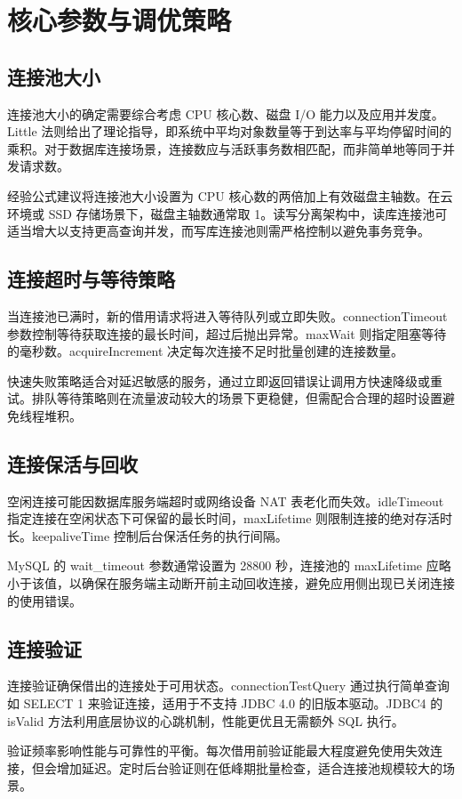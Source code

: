 \chapter{核心参数与调优策略}
\section{连接池大小}
连接池大小的确定需要综合考虑 CPU 核心数、磁盘 I/O 能力以及应用并发度。Little 法则给出了理论指导，即系统中平均对象数量等于到达率与平均停留时间的乘积。对于数据库连接场景，连接数应与活跃事务数相匹配，而非简单地等同于并发请求数。\par
经验公式建议将连接池大小设置为 CPU 核心数的两倍加上有效磁盘主轴数。在云环境或 SSD 存储场景下，磁盘主轴数通常取 1。读写分离架构中，读库连接池可适当增大以支持更高查询并发，而写库连接池则需严格控制以避免事务竞争。\par
\section{连接超时与等待策略}
当连接池已满时，新的借用请求将进入等待队列或立即失败。connectionTimeout 参数控制等待获取连接的最长时间，超过后抛出异常。maxWait 则指定阻塞等待的毫秒数。acquireIncrement 决定每次连接不足时批量创建的连接数量。\par
快速失败策略适合对延迟敏感的服务，通过立即返回错误让调用方快速降级或重试。排队等待策略则在流量波动较大的场景下更稳健，但需配合合理的超时设置避免线程堆积。\par
\section{连接保活与回收}
空闲连接可能因数据库服务端超时或网络设备 NAT 表老化而失效。idleTimeout 指定连接在空闲状态下可保留的最长时间，maxLifetime 则限制连接的绝对存活时长。keepaliveTime 控制后台保活任务的执行间隔。\par
MySQL 的 wait\_{}timeout 参数通常设置为 28800 秒，连接池的 maxLifetime 应略小于该值，以确保在服务端主动断开前主动回收连接，避免应用侧出现已关闭连接的使用错误。\par
\section{连接验证}
连接验证确保借出的连接处于可用状态。connectionTestQuery 通过执行简单查询如 SELECT 1 来验证连接，适用于不支持 JDBC 4.0 的旧版本驱动。JDBC4 的 isValid 方法利用底层协议的心跳机制，性能更优且无需额外 SQL 执行。\par
验证频率影响性能与可靠性的平衡。每次借用前验证能最大程度避免使用失效连接，但会增加延迟。定时后台验证则在低峰期批量检查，适合连接池规模较大的场景。\par
